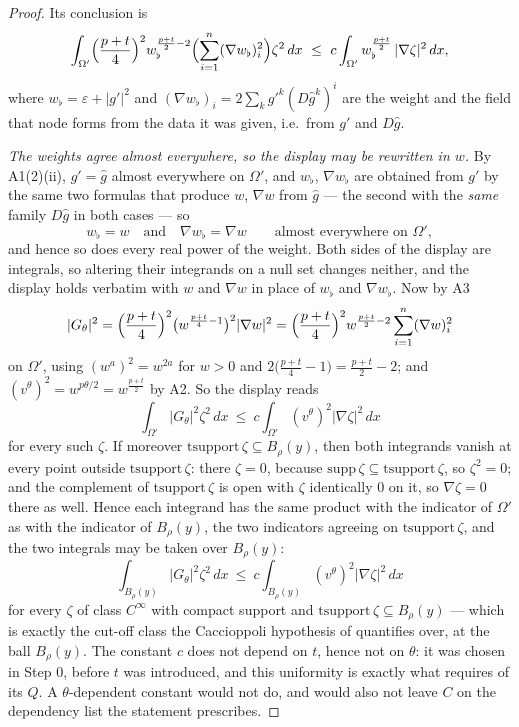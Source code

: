\begin{proof}
Its conclusion is
\[
\int_{\Omega'}\Bigl(\frac{p+t}4\Bigr)^2w_\flat^{\frac{p+t}2-2}
\Bigl(\sum_{i=1}^n(\nabla w_\flat)_i^2\Bigr)\zeta^2\,dx
\ \le\ c\int_{\Omega'}w_\flat^{\frac{p+t}2}\,|\nabla\zeta|^2\,dx ,
\]
where $w_\flat=\varepsilon+|g'|^2$ and
$(\nabla w_\flat)_i=2\sum_kg'^k(D\hat g^k)^i$ are the weight and the field that
node forms from the data it was given, i.e.\ from $g'$ and $D\hat g$.

\emph{The weights agree almost everywhere, so the display may be rewritten in
$w$.}  By A1(2)(ii), $g'=\hat g$ almost everywhere on $\Omega'$, and
$w_\flat$, $\nabla w_\flat$ are obtained from $g'$ by the same two formulas that
produce $w$, $\nabla w$ from $\hat g$ --- the second with the \emph{same} family
$D\hat g$ in both cases --- so
\[
w_\flat=w\quad\text{and}\quad \nabla w_\flat=\nabla w
\qquad\text{almost everywhere on }\Omega' ,
\tag{A4b}
\]
and hence so does every real power of the weight.  Both sides of the display are
integrals, so altering their integrands on a null set changes neither, and the
display holds verbatim with $w$ and $\nabla w$ in place of $w_\flat$ and
$\nabla w_\flat$.  Now by A3
\[
|G_\theta|^2=\Bigl(\frac{p+t}4\Bigr)^2\bigl(w^{\frac{p+t}4-1}\bigr)^2|\nabla w|^2
=\Bigl(\frac{p+t}4\Bigr)^2w^{\frac{p+t}2-2}\sum_{i=1}^n(\nabla w)_i^2
\]
on $\Omega'$, using $(w^a)^2=w^{2a}$ for $w>0$ and
$2\bigl(\frac{p+t}4-1\bigr)=\frac{p+t}2-2$; and
$(v^\theta)^2=w^{p\theta/2}=w^{\frac{p+t}2}$ by A2.  So the display reads
\[
\int_{\Omega'}|G_\theta|^2\zeta^2\,dx
\ \le\ c\int_{\Omega'}(v^\theta)^2|\nabla\zeta|^2\,dx
\]
for every such $\zeta$.
If moreover $\mathrm{tsupport}\,\zeta\subseteq B_\rho(y)$, then both integrands
vanish at every point outside $\mathrm{tsupport}\,\zeta$: there $\zeta=0$,
because $\mathrm{supp}\,\zeta\subseteq\mathrm{tsupport}\,\zeta$, so $\zeta^2=0$;
and the complement of $\mathrm{tsupport}\,\zeta$ is open with $\zeta$
identically $0$ on it, so $\nabla\zeta=0$ there as well.  Hence each integrand
has the same product with the indicator of $\Omega'$ as with the indicator of
$B_\rho(y)$, the two indicators agreeing on $\mathrm{tsupport}\,\zeta$, and the
two integrals may be taken over $B_\rho(y)$:
\[
\int_{B_\rho(y)}|G_\theta|^2\zeta^2\,dx
\ \le\ c\int_{B_\rho(y)}(v^\theta)^2|\nabla\zeta|^2\,dx
\tag{A4}
\]
for every $\zeta$ of class $C^\infty$ with compact support and
$\mathrm{tsupport}\,\zeta\subseteq B_\rho(y)$ --- which is exactly the cut-off
class the Caccioppoli hypothesis of  quantifies
over, at the ball $B_\rho(y)$.  The constant
$c$ does not depend on $t$, hence not on $\theta$: it was chosen in Step 0,
before $t$ was introduced, and this uniformity is exactly what
 requires of its $Q$.  A $\theta$-dependent
constant would not do, and would also not leave $C$ on the dependency list the
statement prescribes.


\end{proof}
